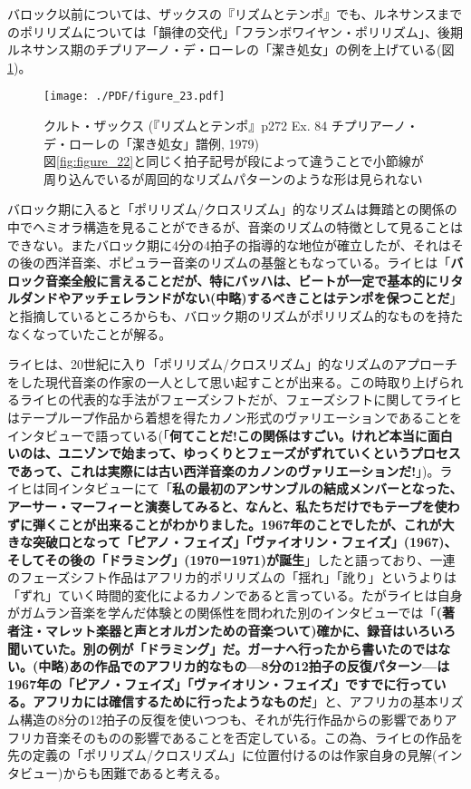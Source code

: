 \documentclass[uplatex,dvipdfmx]{ujarticle}
\begin{document}
バロック以前については、ザックスの『リズムとテンポ』でも、ルネサンスまでのポリリズムについては「韻律の交代」「フランボワイヤン・ポリリズム」、後期ルネサンス期のチプリアーノ・デ・ローレの「潔き処女」の例を上げている(図\ref{fig:figure_23})。

\begin{figure}[ht]
\centerline{
	\texttt{[image: ./PDF/figure\_23.pdf]}
}
\caption{クルト・ザックス (『リズムとテンポ』p272 Ex. 84 チプリアーノ・デ・ローレの「潔き処女」譜例, 1979)\\
図\ref{fig:figure_22}と同じく拍子記号が段によって違うことで小節線が周り込んでいるが周回的なリズムパターンのような形は見られない}
\label{fig:figure_23}
\end{figure}

バロック期に入ると「ポリリズム/クロスリズム」的なリズムは舞踏との関係の中でヘミオラ構造を見ることができるが、音楽のリズムの特徴として見ることはできない。またバロック期に4分の4拍子の指導的な地位が確立したが、それはその後の西洋音楽、ポピュラー音楽のリズムの基盤ともなっている。ライヒは「{\bf バロック音楽全般に言えることだが、特にバッハは、ビートが一定で基本的にリタルダンドやアッチェレランドがない(中略)するべきことはテンポを保つことだ}」\cite{strickland:01}と指摘しているところからも、バロック期のリズムがポリリズム的なものを持たなくなっていたことが解る。

ライヒは、20世紀に入り「ポリリズム/クロスリズム」的なリズムのアプローチをした現代音楽の作家の一人として思い起すことが出来る。この時取り上げられるライヒの代表的な手法がフェーズシフトだが、フェーズシフトに関してライヒはテープループ作品から着想を得たカノン形式のヴァリエーションであることをインタビューで語っている(「{\bf 何てことだ!この関係はすごい。けれど本当に面白いのは、ユニゾンで始まって、ゆっくりとフェーズがずれていくというプロセスであって、これは実際には古い西洋音楽のカノンのヴァリエーションだ!}」\cite{obrist:01})。ライヒは同インタビューにて「{\bf 私の最初のアンサンブルの結成メンバーとなった、アーサー・マーフィーと演奏してみると、なんと、私たちだけでもテープを使わずに弾くことが出来ることがわかりました。1967年のことでしたが、これが大きな突破口となって「ピアノ・フェイズ」「ヴァイオリン・フェイズ」(1967)、そしてその後の「ドラミング」(1970ー1971)が誕生}」\cite{obrist:01}したと語っており、一連のフェーズシフト作品はアフリカ的ポリリズムの「揺れ」「訛り」というよりは「ずれ」ていく時間的変化によるカノンであると言っている。たがライヒは自身がガムラン音楽を学んだ体験との関係性を問われた別のインタビューでは「{\bf (著者注・マレット楽器と声とオルガンための音楽ついて)確かに、録音はいろいろ聞いていた。別の例が「ドラミング」だ。ガーナへ行ったから書いたのではない。(中略)あの作品でのアフリカ的なもの---8分の12拍子の反復パターン---は1967年の「ピアノ・フェイズ」「ヴァイオリン・フェイズ」ですでに行っている。アフリカには確信するために行ったようなものだ}」\cite{strickland:01}と、アフリカの基本リズム構造の8分の12拍子の反復を使いつつも、それが先行作品からの影響でありアフリカ音楽そのものの影響であることを否定している。この為、ライヒの作品を先の定義の「ポリリズム/クロスリズム」に位置付けるのは作家自身の見解(インタビュー)からも困難であると考える。
\end{document}
